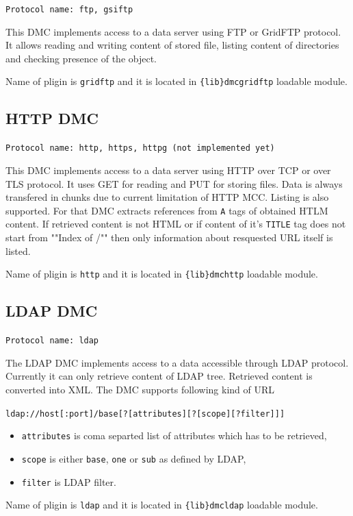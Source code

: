 \documentclass{book}
\begin{document}
\texttt{Protocol name: ftp, gsiftp}

This DMC implements access to a data server using FTP or GridFTP protocol. It allows reading and writing content of stored file, listing content of directories and checking presence of the object.

Name of pligin is \texttt{gridftp} and it is located in \texttt{\{lib\}dmcgridftp} loadable module.


\subsection{HTTP DMC}

\texttt{Protocol name: http, https, httpg (not implemented yet)}

This DMC implements access to a data server using HTTP over TCP or over TLS protocol. It uses GET for reading and PUT for storing files. Data is always transfered in chunks due to current limitation of HTTP MCC. Listing is also supported. For that DMC extracts references from \texttt{A} tags of obtained HTLM content. If retrieved content is not HTML or if content of it's \texttt{TITLE} tag does not start from ""Index of /"" then only information about resquested URL itself is listed.

Name of pligin is \texttt{http} and it is located in \texttt{\{lib\}dmchttp} loadable module.


\subsection{LDAP DMC}

\texttt{Protocol name: ldap}

The LDAP DMC implements access to a data accessible through LDAP protocol. Currently it can only retrieve content of LDAP tree. Retrieved content is converted into XML. The DMC supports following kind of URL

\texttt{ldap://host[:port]/base[?[attributes][?[scope][?filter]]]}

\begin{itemize}
\item \texttt{attributes} is coma separted list of attributes which has to be retrieved,
\item \texttt{scope} is either \texttt{base}, \texttt{one} or \texttt{sub} as defined by LDAP,
\item \texttt{filter} is LDAP filter.
\end{itemize}

Name of pligin is \texttt{ldap} and it is located in \texttt{\{lib\}dmcldap} loadable module.
\end{document}
